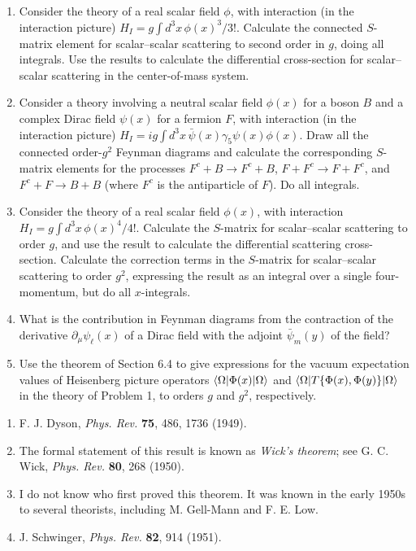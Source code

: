 \begin{enumerate}
\item Consider the theory of a real scalar field $\phi$, with interaction
(in the interaction picture)
$H_I=g\int d^3x\,\phi(x)^3/3!$.
Calculate the connected $S$-matrix element for scalar--scalar scattering to
second order in $g$, doing all integrals. Use the results to calculate the
differential cross-section for scalar--scalar scattering in the
center-of-mass system.

\item Consider a theory involving a neutral scalar field $\phi(x)$ for a
boson $B$ and a complex Dirac field $\psi(x)$ for a fermion $F$, with
interaction (in the interaction picture)
$H_I=ig\int d^3x\,\bar\psi(x)\gamma_5\psi(x)\phi(x)$.
Draw all the connected order-$g^2$ Feynman diagrams and calculate the
corresponding $S$-matrix elements for the processes
$F^c+B\to F^c+B$, $F+F^c\to F+F^c$, and $F^c+F\to B+B$
(where $F^c$ is the antiparticle of $F$). Do all integrals.

\item Consider the theory of a real scalar field $\phi(x)$, with interaction
$H_I=g\int d^3x\,\phi(x)^4/4!$.
Calculate the $S$-matrix for scalar--scalar scattering to order $g$, and use
the result to calculate the differential scattering cross-section. Calculate
the correction terms in the $S$-matrix for scalar--scalar scattering to order
$g^2$, expressing the result as an integral over a single four-momentum, but
do all $x$-integrals.

\item What is the contribution in Feynman diagrams from the contraction of
the derivative $\partial_\mu\psi_\ell(x)$ of a Dirac field with the adjoint
$\bar\psi_m(y)$ of the field?

\item Use the theorem of Section 6.4 to give expressions for the vacuum
expectation values of Heisenberg picture operators
$\langle \Omega\rvert\Phi(x)\lvert \Omega\rangle$ and
$\langle \Omega\rvert T\{\Phi(x),\Phi(y)\}\lvert \Omega\rangle$ in the theory of Problem 1,
to orders $g$ and $g^2$, respectively.
\end{enumerate}


\begin{enumerate}
\item\label{ref:6.1} F. J. Dyson, \emph{Phys. Rev.} \textbf{75}, 486, 1736 (1949).

\item\label{ref:6.2} The formal statement of this result is known as \textit{Wick's
theorem}; see G. C. Wick, \emph{Phys. Rev.} \textbf{80}, 268 (1950).

\item\label{ref:6.3} I do not know who first proved this theorem. It was known in the early
1950s to several theorists, including M. Gell-Mann and F. E. Low.

\item\label{ref:6.4} J. Schwinger, \emph{Phys. Rev.} \textbf{82}, 914 (1951).
\end{enumerate}

